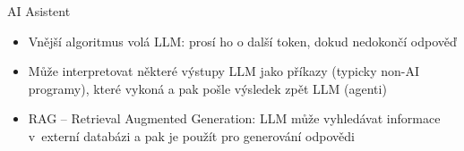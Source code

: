 \begin{frame}{AI Asistent}

    \begin{itemize}[<+->]

        \item Vnější algoritmus volá LLM: prosí ho o další token, dokud nedokončí odpověď

        \item Může interpretovat některé výstupy LLM jako příkazy (typicky
            non-AI programy), které vykoná a pak pošle výsledek zpět LLM (agenti)

        \item RAG -- Retrieval Augmented Generation: LLM může vyhledávat
            informace v~externí databázi a pak je použít pro generování odpovědi

    \end{itemize}

\end{frame}


